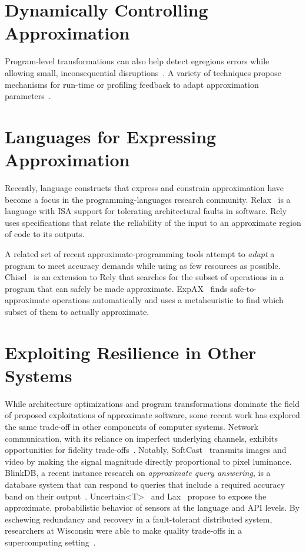 \section{Dynamically Controlling Approximation}

Program-level transformations can also help detect egregious errors while
allowing small, inconsequential disruptions~\cite{lwc, approxdebug}.
A variety of techniques propose mechanisms for run-time or profiling feedback to adapt
approximation parameters~\cite{dynamicknobs, green, approxit, ansel-autotuning}.

\section{Languages for Expressing Approximation}

Recently, language constructs that express and constrain
approximation have become a focus in the programming-languages research
community.
Relax~\cite{relax} is a language with ISA support for tolerating architectural
faults in software.
Rely~\cite{rely} uses specifications that relate the reliability of the input
to an approximate region of code to its outputs.

A related set of recent approximate-programming tools attempt to \emph{adapt}
a program to meet accuracy demands while using as few resources as possible.
Chisel~\cite{chisel} is an extension to Rely that searches for the subset of
operations in a program that can safely be made approximate.
ExpAX~\cite{expax-tr} finds safe-to-approximate operations automatically and
uses a metaheuristic to find which subset of them to actually approximate.


\section{Exploiting Resilience in Other Systems}

While architecture optimizations and program transformations dominate the
field of proposed exploitations of approximate software, some recent work has
explored the same trade-off in other components of computer systems. Network
communication, with its reliance on imperfect underlying channels, exhibits
opportunities for fidelity trade-offs~\cite{softcast, luo-globecom, apex,
smpmup2006}. Notably, SoftCast~\cite{softcast} transmits images and video by
making the signal magnitude directly proportional to pixel luminance. BlinkDB,
a recent instance research on \emph{approximate query answering},
is a database system that can respond to queries that include a required
accuracy band on their output~\cite{blinkdb}.
Uncertain{\textless}T{\textgreater}~\cite{uncertaint} and Lax~\cite{lax}
propose to expose the approximate, probabilistic behavior of sensors at the
language and API levels.
By eschewing redundancy and
recovery in a fault-tolerant distributed system, researchers at Wisconsin were
able to make quality trade-offs in a supercomputing
setting~\cite{dekruijf-icpp}.


